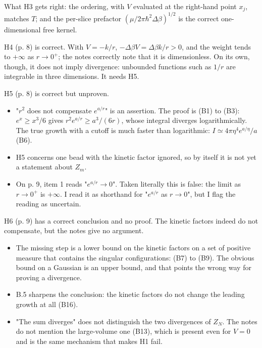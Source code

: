 \documentclass[11pt,a4paper]{article}
\providecommand{\tightlist}{\setlength{\itemsep}{0pt}\setlength{\parskip}{0pt}}
\begin{document}
What H3 gets right: the ordering, with \(V\) evaluated at the right-hand point \(x_j\), matches \(T\); and the per-slice prefactor \((\mu/2\pi\hbar^2\Delta\beta)^{1/2}\) is the correct one-dimensional free kernel.

H4 (p. 8) is correct. With \(V=-k/r\), \(-\Delta\beta V=\Delta\beta k/r>0\), and the weight tends to \(+\infty\) as \(r\to0^+\); the notes correctly note that it is dimensionless. On its own, though, it does not imply divergence: unbounded functions such as \(1/r\) are integrable in three dimensions. It needs H5.

H5 (p. 8) is correct but unproven.

\begin{itemize}
\tightlist
\item
  "\(r^2\) does not compensate \(e^{a/r}\)" is an assertion. The proof is (B1) to (B3): \(e^x\ge x^3/6\) gives \(r^2e^{a/r}\ge a^3/(6r)\), whose integral diverges logarithmically. The true growth with a cutoff is much faster than logarithmic: \(I\simeq4\pi\eta^4e^{a/\eta}/a\) (B6).
\item
  H5 concerns one bead with the kinetic factor ignored, so by itself it is not yet a statement about \(Z_m\).
\item
  On p. 9, item 1 reads "\(e^{a/r}\to0\)". Taken literally this is false: the limit as \(r\to0^+\) is \(+\infty\). I read it as shorthand for "\(e^{a/r}\) as \(r\to0\)", but I flag the reading as uncertain.
\end{itemize}

H6 (p. 9) has a correct conclusion and no proof. The kinetic factors indeed do not compensate, but the notes give no argument.

\begin{itemize}
\tightlist
\item
  The missing step is a lower bound on the kinetic factors on a set of positive measure that contains the singular configurations: (B7) to (B9). The obvious bound on a Gaussian is an upper bound, and that points the wrong way for proving a divergence.
\item
  B.5 sharpens the conclusion: the kinetic factors do not change the leading growth at all (B16).
\item
  "The sum diverges" does not distinguish the two divergences of \(Z_N\). The notes do not mention the large-volume one (B13), which is present even for \(V=0\) and is the same mechanism that makes H1 fail.
\end{itemize}
\end{document}
